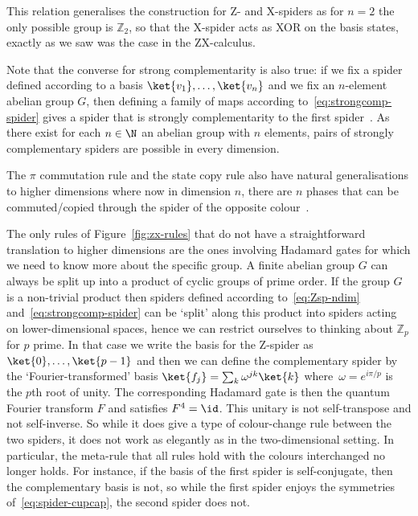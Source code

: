 \documentclass[a4paper,onecolumn,superscriptaddress,11pt,%
				unpublished,%
				allowfontchageintitle,%
				]{quantumarticle}
\begin{document}
This relation generalises the construction for Z- and X-spiders as for $n=2$ the only possible group is $\mathbb Z_2$, so that the X-spider acts as XOR on the basis states, exactly as we saw was the case in the ZX-calculus.

Note that the converse for strong complementarity is also true: if we fix a spider defined according to a basis $\ket{v_1},\ldots,\ket{v_n}$ and we fix an $n$-element abelian group $G$, then defining a family of maps according to~\eqref{eq:strongcomp-spider} gives a spider that is strongly complementarity to the first spider~\cite{coecke2012strong}. As there exist for each $n\in \N$ an abelian group with $n$ elements, pairs of strongly complementary spiders are possible in every dimension.

The $\pi$ commutation rule \PiRule and the state copy rule \CopyRule also have natural generalisations to higher dimensions where now in dimension $n$, there are $n$ phases that can be commuted/copied through the spider of the opposite colour~\cite{coecke2012strong}.

The only rules of Figure~\ref{fig:zx-rules} that do not have a straightforward translation to higher dimensions are the ones involving Hadamard gates for which we need to know more about the specific group.
A finite abelian group $G$ can always be split up into a product of cyclic groups of prime order. If the group $G$ is a non-trivial product then spiders defined according to~\eqref{eq:Zsp-ndim} and~\eqref{eq:strongcomp-spider} can be `split' along this product into spiders acting on lower-dimensional spaces, hence we can restrict ourselves to thinking about $\mathbb Z_p$ for $p$ prime.
In that case we write the basis for the Z-spider as $\ket{0},\ldots,\ket{p-1}$ and then we can define the complementary spider by the `Fourier-transformed' basis $\ket{f_j} = \sum_k \omega^{jk} \ket{k}$ where~$\omega = e^{i\pi/p}$ is the $p$th root of unity. 
The corresponding Hadamard gate is then the quantum Fourier transform $F$ and satisfies $F^4 = \id$. This unitary is not self-transpose and not self-inverse. 
So while it does give a type of colour-change rule between the two spiders, it does not work as elegantly as in the two-dimensional setting. In particular,  the meta-rule that all rules hold with the colours interchanged no longer holds. For instance, if the basis of the first spider is self-conjugate, then the complementary basis is not, so while the first spider enjoys the symmetries of~\eqref{eq:spider-cupcap}, the second spider does not.
\end{document}

